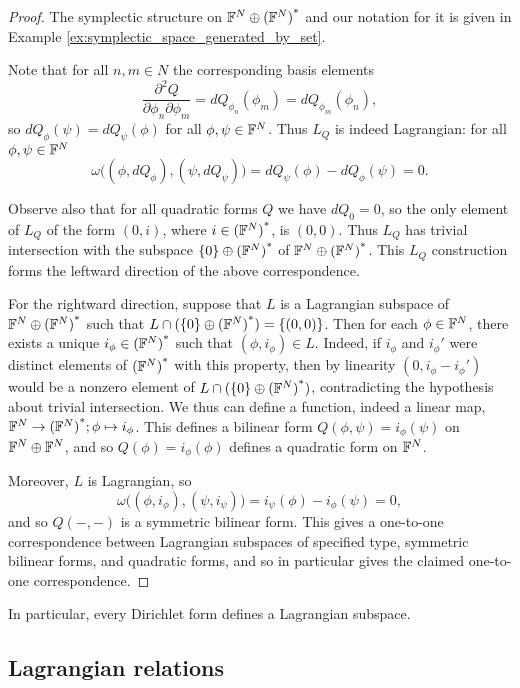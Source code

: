 \begin{proof}
  The symplectic structure on ${{\mathbb F}^{N} \oplus {({\mathbb F}^{N})}^\ast}$ and our notation for it is given in
  Example \ref{ex:symplectic_space_generated_by_set}. 

  Note that for all $n,m \in N$ the corresponding basis elements 
  \[
    \frac{\partial^2 Q}{\partial \phi_n \partial \phi_m} = dQ_{\phi_n}(\phi_m) =
    dQ_{\phi_m}(\phi_n),
  \]
  so $dQ_\phi(\psi) = dQ_\psi(\phi)$ for all $\phi,\psi \in {\mathbb F}^N$. Thus $L_Q$ is
  indeed Lagrangian: for all $\phi,\psi \in {\mathbb F}^N$ 
  \[
    \omega\big((\phi,dQ_\phi),(\psi,dQ_\psi)\big) = dQ_\psi(\phi) -
    dQ_\phi(\psi) = 0.
  \]

  Observe also that for all quadratic forms $Q$ we have $dQ_0 = 0$, so the only
  element of $L_Q$ of the form $(0,i)$, where $i \in {({\mathbb F}^N)}^\ast$, is $(0,0)$.
  Thus $L_Q$ has trivial intersection with the subspace $\{0\} \oplus
  {({\mathbb F}^N)}^\ast$ of ${{\mathbb F}^{N} \oplus {({\mathbb F}^{N})}^\ast}$. This $L_Q$ construction forms the leftward
  direction of the above correspondence.

  For the rightward direction, suppose that $L$ is a Lagrangian subspace of
  ${{\mathbb F}^{N} \oplus {({\mathbb F}^{N})}^\ast}$ such that $L \cap (\{0\} \oplus {({\mathbb F}^N)}^\ast) = \{(0,0)\}$. Then
  for each $\phi \in {\mathbb F}^N$, there exists a unique $i_\phi \in {({\mathbb F}^N)}^\ast$
  such that $(\phi,i_\phi) \in L$. Indeed, if $i_\phi$ and $i_\phi'$ were
  distinct elements of ${({\mathbb F}^N)}^\ast$ with this property, then by linearity
  $(0,i_\phi-i_\phi')$ would be a nonzero element of $L \cap (\{0\} \oplus
  {({\mathbb F}^N)}^\ast)$, contradicting the hypothesis about trivial intersection. We
  thus can define a function, indeed a linear map, ${\mathbb F}^N \to {({\mathbb F}^N)}^\ast; \phi
  \mapsto i_\phi$. This defines a bilinear form $Q(\phi,\psi) = i_\phi(\psi)$ on
  ${\mathbb F}^N \oplus {\mathbb F}^N$, and so $Q(\phi) = i_\phi(\phi)$ defines a quadratic form
  on ${\mathbb F}^N$. 

  Moreover, $L$ is Lagrangian, so
  \[
    \omega\big((\phi,i_\phi), (\psi,i_\psi)\big) = i_\psi(\phi) - i_\phi(\psi) =
    0,
  \]
  and so $Q(-,-)$ is a symmetric bilinear form. This gives a one-to-one
  correspondence between Lagrangian subspaces of specified type, symmetric
  bilinear forms, and quadratic forms, and so in particular gives the claimed
  one-to-one correspondence. 
\end{proof}

In particular, every Dirichlet form defines a Lagrangian subspace. 

\subsection{Lagrangian relations}

